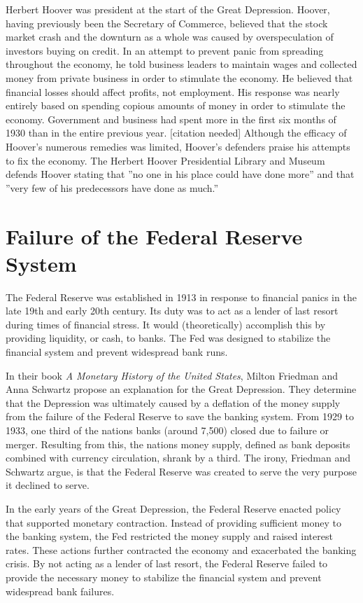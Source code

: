 \documentclass{article}
\begin{document}
Herbert Hoover was president at the start of the Great Depression. Hoover,
having previously been the Secretary of Commerce, believed that the stock
market crash and the downturn as a whole was caused by overspeculation of
investors buying on credit. In an attempt to prevent panic from spreading
throughout the economy, he told business leaders to maintain wages and
collected money from private business in order to stimulate the economy. He
believed that financial losses should affect profits, not employment. His
response was nearly entirely based on spending copious amounts of money in
order to stimulate the economy. Government and business had spent more in the
first six months of 1930 than in the entire previous year. [citation needed]
Although the efficacy of Hoover’s numerous remedies was limited, Hoover’s
defenders praise his attempts to fix the economy. The Herbert Hoover
Presidential Library and Museum defends Hoover stating that ”no one in his
place could have done more” and that ”very few of his predecessors have done as
much.”

\section{Failure of the Federal Reserve System}

The Federal Reserve was established in 1913 in response to financial panics in
the late 19th and early 20th century. Its duty was to act as a lender of last
resort during times of financial stress. It would (theoretically) accomplish
this by providing liquidity, or cash, to banks. The Fed was designed to
stabilize the financial system and prevent widespread bank runs.

In their book \textit{A Monetary History of the United States}, Milton Friedman
and Anna Schwartz propose an explanation for the Great Depression. They
determine that the Depression was ultimately caused by a deflation of the money
supply from the failure of the Federal Reserve to save the banking system. From
1929 to 1933, one third of the nations banks (around 7,500) closed due to
failure or merger. Resulting from this, the nations money supply, defined as
bank deposits combined with currency circulation, shrank by a third. The irony,
Friedman and Schwartz argue, is that the Federal Reserve was created to serve
the very purpose it declined to serve.

In the early years of the Great Depression, the Federal Reserve enacted policy
that supported monetary contraction. Instead of providing sufficient money to
the banking system, the Fed restricted the money supply and raised interest
rates. These actions further contracted the economy and exacerbated the banking
crisis. By not acting as a lender of last resort, the Federal Reserve failed to
provide the necessary money to stabilize the financial system and prevent
widespread bank failures.
\end{document}
